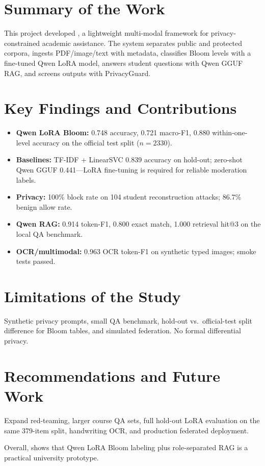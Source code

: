 \section{Summary of the Work}

This project developed \systemname, a lightweight multi-modal framework for privacy-constrained academic assistance. The system separates public and protected corpora, ingests PDF/image/text with metadata, classifies Bloom levels with a fine-tuned Qwen LoRA model, answers student questions with Qwen GGUF RAG, and screens outputs with PrivacyGuard.

\section{Key Findings and Contributions}

\begin{itemize}
    \item \textbf{Qwen LoRA Bloom:} 0.748 accuracy, 0.721 macro-F1, 0.880 within-one-level accuracy on the official test split ($n{=}2330$).
    \item \textbf{Baselines:} TF-IDF + LinearSVC 0.839 accuracy on hold-out; zero-shot Qwen GGUF 0.441---LoRA fine-tuning is required for reliable moderation labels.
    \item \textbf{Privacy:} 100\% block rate on 104 student reconstruction attacks; 86.7\% benign allow rate.
    \item \textbf{Qwen RAG:} 0.914 token-F1, 0.800 exact match, 1.000 retrieval hit@3 on the local QA benchmark.
    \item \textbf{OCR/multimodal:} 0.963 OCR token-F1 on synthetic typed images; smoke tests passed.
\end{itemize}

\section{Limitations of the Study}

Synthetic privacy prompts, small QA benchmark, hold-out vs.\ official-test split difference for Bloom tables, and simulated federation. No formal differential privacy.

\section{Recommendations and Future Work}

Expand red-teaming, larger course QA sets, full hold-out LoRA evaluation on the same 379-item split, handwriting OCR, and production federated deployment.

Overall, \systemname{} shows that Qwen LoRA Bloom labeling plus role-separated RAG is a practical university prototype.
